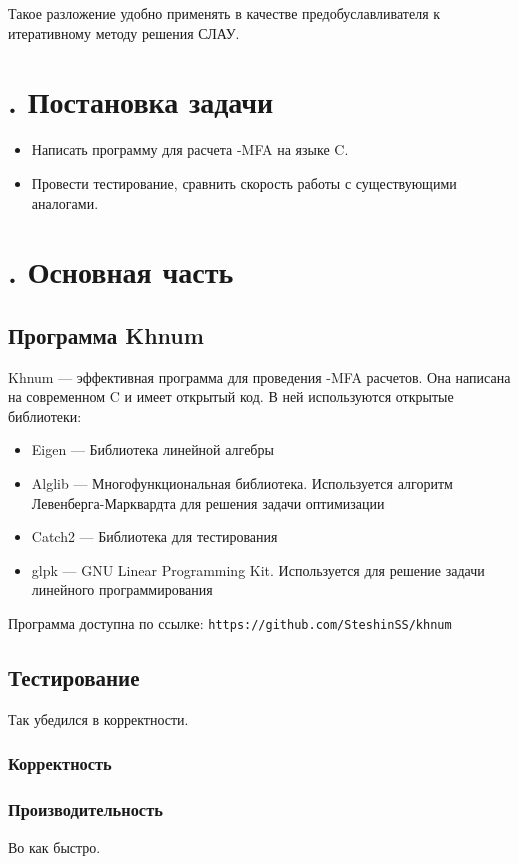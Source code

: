 \documentclass[14pt, a4paper]{extreport}
\newcommand{\CC}{C\nolinebreak\hspace{-.05em}\raisebox{.4ex}{\tiny\bf +}\nolinebreak\hspace{-.10em}\raisebox{.4ex}{\tiny\bf +}}
\def\CC{{C\nolinebreak[4]\hspace{-.05em}\raisebox{.4ex}{\tiny\bf ++}}} %
\begin{document}
Такое разложение удобно применять в качестве предобуславливателя к итеративному методу решения СЛАУ.


\chapter[Постановка задачи]{\thechapter{}. Постановка задачи}
\begin{itemize}
	\item Написать программу для расчета -MFA на языке \CC.
	\item Провести тестирование, сравнить скорость работы с существующими аналогами.
\end{itemize}

\chapter[Основная часть]{\thechapter{}. Основная часть}
\section{Программа Khnum}
Khnum --- эффективная программа для проведения -MFA расчетов. Она написана на современном \CC{} и имеет открытый код. В ней используются открытые библиотеки:
\begin{itemize}
	\item Eigen --- Библиотека линейной алгебры
	\item Alglib --- Многофункциональная библиотека. Используется алгоритм Левенберга-Марквардта для решения задачи оптимизации
	\item Catch2 --- Библиотека для тестирования
	\item glpk --- GNU Linear Programming Kit. Используется для решение задачи линейного программирования
\end{itemize}
Программа доступна по ссылке: \texttt{https://github.com/SteshinSS/khnum}

\section{Тестирование}
Так убедился в корректности.

\subsection{Корректность}

\subsection{Производительность}
Во как быстро.
\end{document}
